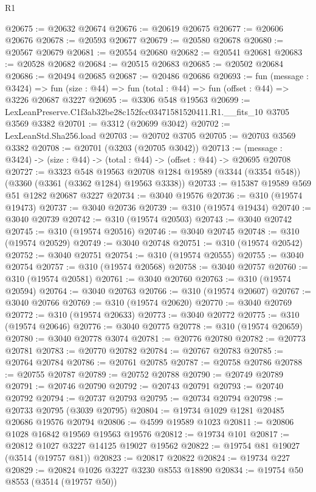 \begin{lexlean}{R1}
\begin{coremodule}
@20675 := @20632 @20674
@20676 := @20619 @20675
@20677 := @20606 @20676
@20678 := @20593 @20677
@20679 := @20580 @20678
@20680 := @20567 @20679
@20681 := @20554 @20680
@20682 := @20541 @20681
@20683 := @20528 @20682
@20684 := @20515 @20683
@20685 := @20502 @20684
@20686 := @20494 @20685
@20687 := @20486 @20686
@20693 := fun (message : @3424) =>
  fun (size : @44) => fun (total : @44) => fun (offset : @44) => @3226 @20687 @3227
@20695 := @3306 @548 @19563
@20699 := LexLeanPreserve.C1f3ab32be28c152fcc03471581520411.R1.__fits_10 @3705 @3569 @3382
@20701 := @3312 (@20699 @3042)
@20702 := LexLeanStd.Sha256.load
@20703 := @20702 @3705
@20705 := @20703 @3569 @3382
@20708 := @20701 (@3203 (@20705 @3042))
@20713 := (message : @3424) -> (size : @44) -> (total : @44) -> (offset : @44) -> @20695 @20708
@20727 := @3323
    @548
    @19563
    @20708
    @1284
    @19589
    (@3344 (@3354 @548))
    (@3360 (@3361 (@3362 @1284) @19563 @3338))
@20733 := @15387 @19589 @569 @51 @1282 @20687 @3227
@20734 := @3040 @19576
@20736 := @310 (@19574 @19473)
@20737 := @3040 @20736
@20739 := @310 (@19574 @19434)
@20740 := @3040 @20739
@20742 := @310 (@19574 @20503)
@20743 := @3040 @20742
@20745 := @310 (@19574 @20516)
@20746 := @3040 @20745
@20748 := @310 (@19574 @20529)
@20749 := @3040 @20748
@20751 := @310 (@19574 @20542)
@20752 := @3040 @20751
@20754 := @310 (@19574 @20555)
@20755 := @3040 @20754
@20757 := @310 (@19574 @20568)
@20758 := @3040 @20757
@20760 := @310 (@19574 @20581)
@20761 := @3040 @20760
@20763 := @310 (@19574 @20594)
@20764 := @3040 @20763
@20766 := @310 (@19574 @20607)
@20767 := @3040 @20766
@20769 := @310 (@19574 @20620)
@20770 := @3040 @20769
@20772 := @310 (@19574 @20633)
@20773 := @3040 @20772
@20775 := @310 (@19574 @20646)
@20776 := @3040 @20775
@20778 := @310 (@19574 @20659)
@20780 := @3040 @20778 @3074
@20781 := @20776 @20780
@20782 := @20773 @20781
@20783 := @20770 @20782
@20784 := @20767 @20783
@20785 := @20764 @20784
@20786 := @20761 @20785
@20787 := @20758 @20786
@20788 := @20755 @20787
@20789 := @20752 @20788
@20790 := @20749 @20789
@20791 := @20746 @20790
@20792 := @20743 @20791
@20793 := @20740 @20792
@20794 := @20737 @20793
@20795 := @20734 @20794
@20798 := @20733 @20795 (@3039 @20795)
@20804 := @19734 @1029 @1281 @20485 @20686 @19576 @20794
@20806 := @4599 @19589 @1023
@20811 := @20806 @1028 @16842 @19569 @19563 @19576
@20812 := @19734 @101
@20817 := @20812 @1027 @3227 @14125 @19027 @19562
@20822 := @19754 @81 @19027 (@3514 (@19757 @81))
@20823 := @20817 @20822
@20824 := @19734 @227
@20829 := @20824 @1026 @3227 @3230 @8553 @18890
@20834 := @19754 @50 @8553 (@3514 (@19757 @50))

\end{coremodule}
\end{lexlean}
